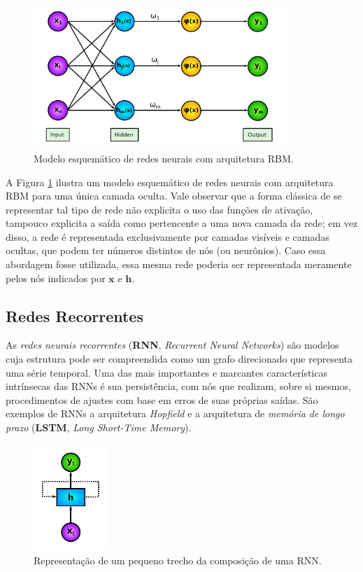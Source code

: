 \begin{figure}[H]
    \centering
    \includegraphics[width=0.85\textwidth]{figs/ann_arch_rbm.pdf}
    \caption{Modelo esquemático de redes neurais com arquitetura RBM.}
    \label{fig:ann_arch_rbm}
\end{figure}

A Figura \ref{fig:ann_arch_rbm} ilustra um modelo esquemático de redes neurais com arquitetura RBM para uma única camada oculta. Vale observar que a forma clássica de se representar tal tipo de rede não explicita o uso das funções de ativação, tampouco explicita a saída como pertencente a uma nova camada da rede; em vez disso, a rede é representada exclusivamente por camadas visíveis e camadas ocultas, que podem ter números distintos de nós (ou neurônios). Caso essa abordagem fosse utilizada, essa mesma rede poderia ser representada meramente pelos nós indicados por $\bm{x}$ e $\bm{h}$.



\subsection{Redes Recorrentes}
\label{subsec:ann_recurrent_nets}

As \textit{redes neurais recorrentes} (\textbf{RNN}, \textit{Recurrent Neural Networks}) \citep{Rumelhart1986} são modelos cuja estrutura pode ser compreendida como um grafo direcionado que representa uma série temporal. Uma das mais importantes e marcantes características intrínsecas das RNNs é sua persistência, com nós que realizam, sobre si mesmos, procedimentos de ajustes com base em erros de suas próprias saídas. São exemplos de RNNs a arquitetura \textit{Hopfield} e a arquitetura de \textit{memória de longo prazo} (\textbf{LSTM}, \textit{Long Short-Time Memory}).

\begin{figure}[H]
    \centering
    \includegraphics[width=0.25\textwidth]{figs/ann_arch_rnn_chunk.pdf}
    \caption{Representação de um pequeno trecho da composição de uma RNN.}
    \label{fig:ann_arch_rnn_chunk}
\end{figure}

